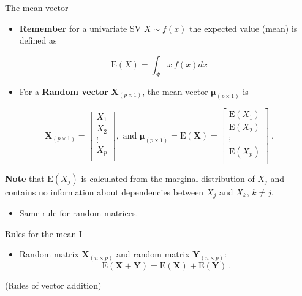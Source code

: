 \documentclass[
  ignorenonframetext,
]{beamer}
\providecommand{\tightlist}{%
  \setlength{\itemsep}{0pt}\setlength{\parskip}{0pt}}
\begin{document}
\begin{frame}
\begin{block}{The mean vector}
\protect\hypertarget{the-mean-vector}{}
\(~\)

\begin{itemize}
\tightlist
\item
  \textbf{Remember} for a univariate SV \(X\sim f(x)\) the expected
  value (mean) is defined as
\end{itemize}

\[
 \text{E}(X) = \int_\mathcal{R}x\ f(x) dx
 \]

\begin{itemize}
\tightlist
\item
  For a \textbf{Random vector} \(\boldsymbol{X}_{(p\times 1)}\), the
  mean vector \(\boldsymbol{\mu}_{(p\times 1)}\) is
\end{itemize}

\[\boldsymbol{X}_{(p\times 1)}=\left[ \begin{array}{c}X_1\\ X_2\\ \vdots\\ X_p\\ \end{array}\right], \text{ and }\boldsymbol{\mu}_{(p \times 1)}=\text{E}(\boldsymbol{X})=\left[ \begin{array}{c}\text{E}(X_1)\\ \text{E}(X_2)\\ \vdots\\ \text{E}(X_p)\\ \end{array}\right] \ .\]

\textbf{Note} that \(\text{E}(X_j)\) is calculated from the marginal
distribution of \(X_j\) and contains no information about dependencies
between \(X_{j}\) and \(X_k\), \(k\neq j\).

\begin{itemize}
\tightlist
\item
  Same rule for random matrices.
\end{itemize}
\end{block}
\end{frame}

\begin{frame}
\begin{block}{Rules for the mean I}
\protect\hypertarget{rules-for-the-mean-i}{}
\(~\)

\begin{itemize}
\tightlist
\item
  Random matrix \(\boldsymbol{X}_{(n\times p)}\) and random matrix
  \(\boldsymbol{Y}_{(n\times p)}\):
  \[\text{E}(\boldsymbol{X}+\boldsymbol{Y})=\text{E}(\boldsymbol{X})+\text{E}(\boldsymbol{Y}) \ .\]
\end{itemize}

(Rules of vector addition)
\end{block}
\end{frame}
\end{document}
